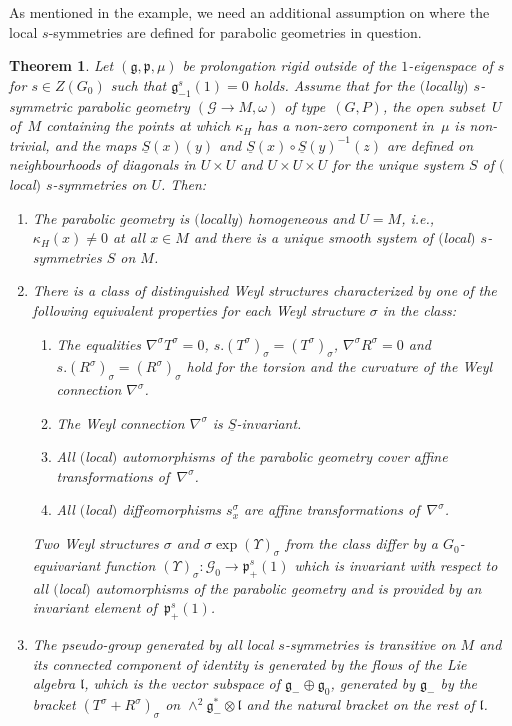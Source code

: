 \documentclass[10pt,a4paper]{amsart}
\newcommand{\om}{\omega}
\newcommand{\si}{\sigma}
\newcommand{\un}{\underline}
\newcommand{\ba}{\mathcal{G}}
\newcommand{\fg}{\mathfrak g}
\newcommand{\fp}{\mathfrak p}
\newcommand{\fl}{\mathfrak l}
\newcommand{\U}{\Upsilon}
\numberwithin{equation}{section}
\newtheorem{Theorem}{Theorem}[section]
\begin{document}
As mentioned in the example, we need an additional assumption on where the local $s$-symmetries are def\/ined for parabolic geometries in question.

\begin{Theorem} \label{6.4}
Let $(\fg,\fp,\mu)$ be prolongation rigid outside of the $1$-eigenspace of $s$ for $s\in Z(G_0)$ such that $\fg_{-1}^s(1)=0$ holds. Assume that for the $($locally$)$ $s$-symmetric parabolic geometry $(\ba\to M,\om)$ of type~$(G,P)$, the open subset~$U$ of~$M$ containing the points at which $\kappa_H$ has a non-zero component in~$\mu$ is non-trivial, and the maps $\un S(x)(y)$ and $\un S(x)\circ \un S(y)^{-1}(z)$ are defined on neighbourhoods of diagonals in $U\times U$ and $U\times U\times U$ for the unique system $S$ of $($local$)$ $s$-symmetries on $U$. Then:
\begin{enumerate}\itemsep=0pt
\item[$1.$]
The parabolic geometry is $($locally$)$ homogeneous and $U=M$, i.e., $\kappa_H(x)\neq 0$ at all $x\in M$ and there is a unique smooth system of $($local$)$ $s$-symmetries $S$ on $M$.
\item[$2.$] There is a class of distinguished Weyl structures characterized by one of the following equivalent properties for each Weyl structure $\si$ in the class:
\begin{enumerate}\itemsep=0pt
\item[$(a)$] The equalities $\nabla^\si T^\si=0$, $s.(T^\si)_\si=(T^\si)_\si$, $\nabla^\si R^\si=0$ and $s.(R^\si)_\si=(R^\si)_\si$ hold for the torsion and the curvature of the Weyl connection $\nabla^\si$.
\item[$(b)$] The Weyl connection $\nabla^\si$ is $\un S$-invariant.
\item[$(c)$] All $($local$)$ automorphisms of the parabolic geometry cover affine transformations of~$\nabla^\si$.
\item[$(d)$] All $($local$)$ diffeomorphisms $s_x^\si$ are affine transformations of~$\nabla^\si$.
\end{enumerate}
Two Weyl structures $\si$ and $\si\exp(\U)_\si$ from the class differ by a $G_0$-equivariant function $(\U)_\si\colon \ba_0\to \fp_+^s(1)$ which is invariant with respect to all $($local$)$ automorphisms of the parabolic geometry and is provided by an invariant element of~$\fp_+^s(1)$.
\item[$3.$] The pseudo-group generated by all local $s$-symmetries is transitive on $M$ and its connected component of identity is generated by the flows of the Lie algebra $\fl$, which is the vector subspace of $\fg_-\oplus \fg_0$, generated by $\fg_-$ by the bracket $(T^\si+R^\si)_\si$ on $\wedge^2 \fg_-^*\otimes \fl$ and the natural bracket on the rest of $\fl$.

\end{enumerate}
\end{Theorem}
\end{document}
